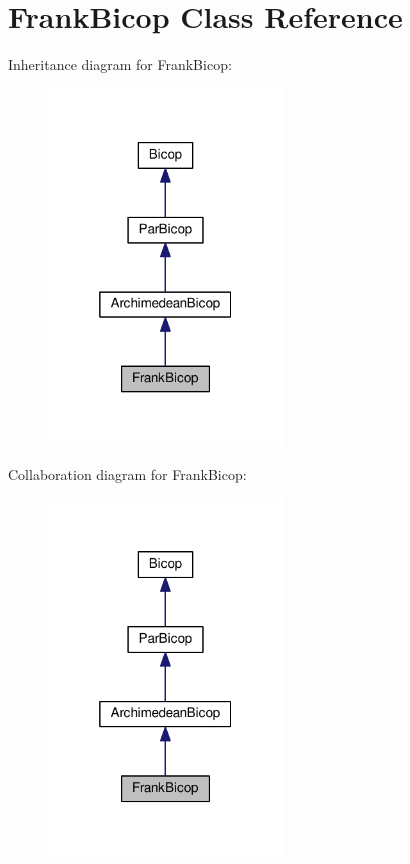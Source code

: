 \hypertarget{class_frank_bicop}{\section{Frank\+Bicop Class Reference}
\label{class_frank_bicop}
}


Inheritance diagram for Frank\+Bicop\+:
\nopagebreak
\begin{figure}[H]
\begin{center}
\leavevmode
\includegraphics[width=176pt]{class_frank_bicop__inherit__graph}
\end{center}
\end{figure}


Collaboration diagram for Frank\+Bicop\+:
\nopagebreak
\begin{figure}[H]
\begin{center}
\leavevmode
\includegraphics[width=176pt]{class_frank_bicop__coll__graph}
\end{center}
\end{figure}
